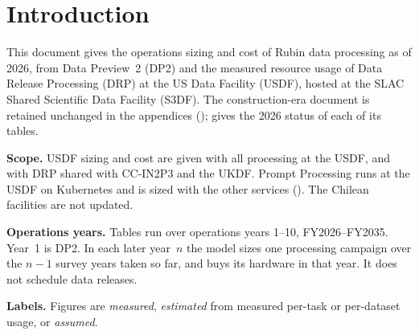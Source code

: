 

\newcommand{\smpara}[1]{\par\medskip\noindent\textbf{#1}\enspace}
\newcommand{\vthirty}{v30\_\allowbreak 0\_\allowbreak 0\_\allowbreak rc2}
\newcommand{\wfortyone}{w\_\allowbreak 2025\_\allowbreak 41}

\section{Introduction}\label{sec:update}

This document gives the operations sizing and cost of Rubin data processing as
of 2026, from Data Preview~2 (DP2) and the measured resource usage of Data
Release Processing (DRP) at the US Data Facility (USDF), hosted at the SLAC
Shared Scientific Data Facility (S3DF). The construction-era document is
retained unchanged in the appendices ();
 gives the 2026 status of each of its tables.

\smpara{Scope.}
USDF sizing and cost are given with all processing at the USDF, and with DRP
shared with CC-IN2P3 and the UKDF. Prompt Processing runs at the USDF on
Kubernetes and is sized with the other services (). The
Chilean facilities are not updated.

\smpara{Operations years.}
Tables run over operations years 1--10, FY2026--FY2035. Year~1 is DP2. In each
later year~$n$ the model sizes one processing campaign over the $n-1$ survey
years taken so far, and buys its hardware in that year. It does not schedule
data releases.

\smpara{Labels.}
Figures are \emph{measured}, \emph{estimated} from measured per-task or
per-dataset usage, or \emph{assumed}.














